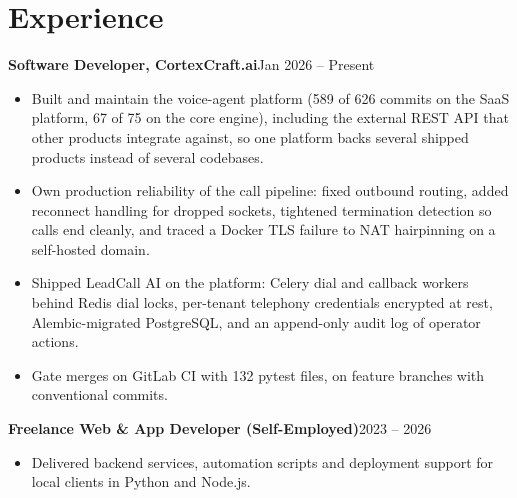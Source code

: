 \documentclass[10pt,a4paper]{article}
\newcommand{\entry}[2]{\textbf{#1}\hfill{#2}\par}
\begin{document}
\section{Experience}
\entry{Software Developer, CortexCraft.ai}{Jan 2026 -- Present}
\begin{itemize}
  \item Built and maintain the voice-agent platform (589 of 626 commits on the SaaS platform, 67 of 75
        on the core engine), including the external REST API that other products integrate against,
        so one platform backs several shipped products instead of several codebases.
  \item Own production reliability of the call pipeline: fixed outbound routing, added reconnect
        handling for dropped sockets, tightened termination detection so calls end cleanly, and
        traced a Docker TLS failure to NAT hairpinning on a self-hosted domain.
  \item Shipped LeadCall AI on the platform: Celery dial and callback workers behind Redis dial locks,
        per-tenant telephony credentials encrypted at rest, Alembic-migrated PostgreSQL, and an
        append-only audit log of operator actions.
  \item Gate merges on GitLab CI with 132 pytest files, on feature branches with conventional commits.
\end{itemize}

\vspace{1pt}
\entry{Freelance Web \& App Developer (Self-Employed)}{2023 -- 2026}
\begin{itemize}
  \item Delivered backend services, automation scripts and deployment support for local clients in Python and Node.js.
\end{itemize}
\end{document}

